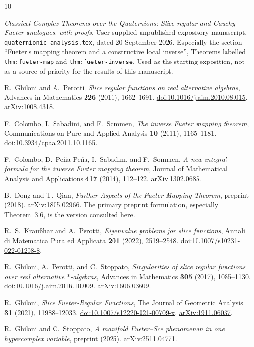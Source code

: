 \documentclass[11pt,a4paper]{article}
\numberwithin{equation}{section}
\theoremstyle{definition}
\theoremstyle{remark}
\begin{document}
\begin{thebibliography}{10}

\emph{Classical Complex Theorems over the Quaternions:
Slice-regular and Cauchy--Fueter analogues, with proofs}.
User-supplied unpublished expository manuscript,
\texttt{quaternionic\_analysis.tex}, dated 20 September 2026.
Especially the section ``Fueter's mapping theorem and a constructive local
inverse'', Theorems labelled \texttt{thm:fueter-map} and
\texttt{thm:fueter-inverse}. Used as the starting exposition, not as a
source of priority for the results of this manuscript.

R.~Ghiloni and A.~Perotti,
\emph{Slice regular functions on real alternative algebras},
Advances in Mathematics \textbf{226} (2011), 1662--1691.
\href{https://doi.org/10.1016/j.aim.2010.08.015}{doi:10.1016/j.aim.2010.08.015}.
\href{https://arxiv.org/abs/1008.4318}{arXiv:1008.4318}.

F.~Colombo, I.~Sabadini, and F.~Sommen,
\emph{The inverse Fueter mapping theorem},
Communications on Pure and Applied Analysis \textbf{10} (2011), 1165--1181.
\href{https://doi.org/10.3934/cpaa.2011.10.1165}{doi:10.3934/cpaa.2011.10.1165}.

F.~Colombo, D.~Pe\~na Pe\~na, I.~Sabadini, and F.~Sommen,
\emph{A new integral formula for the inverse Fueter mapping theorem},
Journal of Mathematical Analysis and Applications \textbf{417} (2014), 112--122.
\href{https://arxiv.org/abs/1302.0685}{arXiv:1302.0685}.

B.~Dong and T.~Qian,
\emph{Further Aspects of the Fueter Mapping Theorem},
preprint (2018).
\href{https://arxiv.org/abs/1805.02966}{arXiv:1805.02966}.
The primary preprint formulation, especially Theorem~3.6, is the version
consulted here.

R.~S.~Krau\ss har and A.~Perotti,
\emph{Eigenvalue problems for slice functions},
Annali di Matematica Pura ed Applicata \textbf{201} (2022), 2519--2548.
\href{https://doi.org/10.1007/s10231-022-01208-8}{doi:10.1007/s10231-022-01208-8}.

R.~Ghiloni, A.~Perotti, and C.~Stoppato,
\emph{Singularities of slice regular functions over real alternative
$*$-algebras},
Advances in Mathematics \textbf{305} (2017), 1085--1130.
\href{https://doi.org/10.1016/j.aim.2016.10.009}{doi:10.1016/j.aim.2016.10.009}.
\href{https://arxiv.org/abs/1606.03609}{arXiv:1606.03609}.

R.~Ghiloni,
\emph{Slice Fueter-Regular Functions},
The Journal of Geometric Analysis \textbf{31} (2021), 11988--12033.
\href{https://doi.org/10.1007/s12220-021-00709-x}{doi:10.1007/s12220-021-00709-x}.
\href{https://arxiv.org/abs/1911.06037}{arXiv:1911.06037}.

R.~Ghiloni and C.~Stoppato,
\emph{A manifold Fueter--Sce phenomenon in one hypercomplex variable},
preprint (2025).
\href{https://arxiv.org/abs/2511.04771}{arXiv:2511.04771}.

\end{thebibliography}
\end{document}
